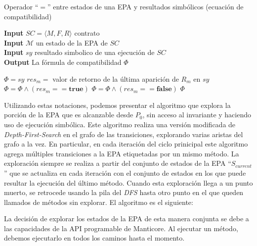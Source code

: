 \begin{algorithm}[H]
    \captionsetup{belowskip=0pt}
    \caption{Operador ``$=$'' entre estados de una EPA y resultados simbólicos (ecuación de compatibilidad)}
    \hspace*{\algorithmicindent} \textbf{Input} $SC = \langle M, F, R \rangle$ contrato \\
    \hspace*{\algorithmicindent} \textbf{Input} $\mathcal{M}$ un estado de la EPA de $SC$ \\
    \hspace*{\algorithmicindent} \textbf{Input} $sy$ resultado simbolico de una ejecución de $SC$ \\
    \hspace*{\algorithmicindent} \textbf{Output} La fórmula de compatibilidad $\Phi$
    \begin{algorithmic}[1]
        \State $\Phi = sy$
        \State $res_m =$ valor de retorno de la última aparición de $R_m$ en $sy$
        \State $\Phi = \Phi \land (res_m == \textbf{true})$
        \Else
        \State $\Phi = \Phi \land (res_m == \textbf{false})$
        \EndIf
        \EndFor
        \State \Return $\Phi$
    \end{algorithmic}
\end{algorithm}

Utilizando estas notaciones, podemos presentar el algoritmo que explora la porción de la EPA que es alcanzable desde $P_0$, sin acceso al invariante y haciendo uso de ejecución simbólica.
Este algoritmo realiza una versión	modificada de \textit{Depth-First-Search} en el grafo de las transiciones, explorando varias aristas del grafo a la vez.
En particular, en cada iteración del ciclo prinicipal este algoritmo agrega múltiples transiciones a la EPA etiquetadas por un mismo método.
La exploración siempre se realiza a partir del conjunto de estados de la EPA ``$S_{current}$'' que se actualiza en cada iteración con el conjunto de estados en los que puede resultar la ejecución del último método.
Cuando esta exploración llega a un punto muerto, se retrocede usando la pila del \textit{DFS} hasta otro punto en el que queden llamados de métodos sin explorar.
El algoritmo es el siguiente:


%    
La decisión de explorar los estados de la EPA de esta manera conjunta se debe a las capacidades de la API programable de Manticore.
Al ejecutar un método, debemos ejecutarlo en todos los caminos hasta el momento.

